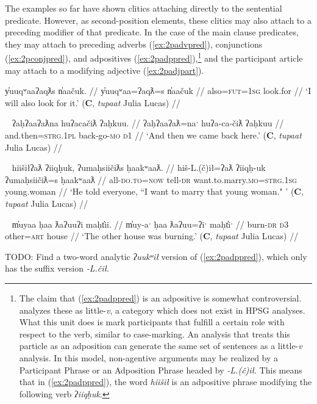 The examples so far have shown clitics attaching directly to the sentential predicate. However, as second-position elements, these clitics may also attach to a preceding modifier of that predicate. In the case of the main clause predicates, they may attach to preceding adverbs (\ref{ex:2padvpred}), conjunctions (\ref{ex:2pconjpred}), and adpositives (\ref{ex:2padppred}),\footnote{The claim that (\ref{ex:2padppred}) is an adpositive is somewhat controversial. \cite{woo2007b} analyzes these as little-\textit{v}, a category which does not exist in HPSG analyses. What this unit does is mark participants that fulfill a certain role with respect to the verb, similar to case-marking. An analysis that treats this particle as an adposition can generate the same set of sentences as a little-\textit{v} analysis. In this model, non-agentive arguments may be realized by a Participant Phrase or an Adposition Phrase headed by \textit{-L.(č)ił}. This means that in (\ref{ex:2padppred}), the word \textit{hiišił} is an adpositive phrase modifying the following verb \textit{ʔiiqḥuk}.} and the participant article may attach to a modifying adjective (\ref{ex:2padjpart}).

\ex \label{ex:2padvpred}
\begingl
\glpreamble y̓uuqʷaaʔaqƛs n̓aačuk. //
\gla y̓uuqʷaa=ʔaqƛ=s n̓aačuk  //
\glb also=\textsc{fut}=\textsc{1sg} look.for //
\glft ‘I will also look for it.’ (\textbf{C}, \textit{tupaat} Julia Lucas) //
\endgl
\xe

\ex~ \label{ex:2pconjpred}
\begingl
\glpreamble ʔaḥʔaaʔaƛna huʔacačiƛ ʔaḥkuu. //
\gla ʔaḥʔaaʔaƛ=naˑ huʔa-ca-čiƛ ʔaḥkuu  //
\glb and.then=\textsc{strg.1pl} back-go-\textsc{mo} \textsc{d1} //
\glft ‘And then we came back here.’ (\textbf{C}, \textit{tupaat} Julia Lucas) //
\endgl
\xe

\ex~ \label{ex:2padppred}
\begingl
\glpreamble hiišiłʔaƛ ʔiiqḥuk, ʔumaḥsiičiƛs ḥaakʷaaƛ. //
\gla hiš-L.(č)ił=ʔaƛ ʔiiqḥ-uk ʔumaḥsiičiƛ=s ḥaakʷaaƛ  //
\glb all-\textsc{do.to}=\textsc{now} tell-\textsc{dr} want.to.marry.\textsc{mo}=\textsc{strg.1sg} young.woman //
\glft ‘He told everyone, ``I want to marry that young woman." ’ (\textbf{C}, \textit{tupaat} Julia Lucas) //
\endgl
\xe

\ex~ \label{ex:2padjpart}
\begingl
\glpreamble m̓uyaa ḥaa ƛaʔuuʔi maḥt̓ii. //
\gla m̓uy-aˑ ḥaa ƛaʔuu=ʔiˑ maḥt̓iˑ  //
\glb burn-\textsc{dr} \textsc{d3} other=\textsc{art} house //
\glft ‘The other house was burning.’ (\textbf{C}, \textit{tupaat} Julia Lucas) //
\endgl
\xe

TODO: Find a two-word analytic \textit{ʔuukʷił} version of (\ref{ex:2padppred}), which only has the suffix version \textit{-L.čił}.

